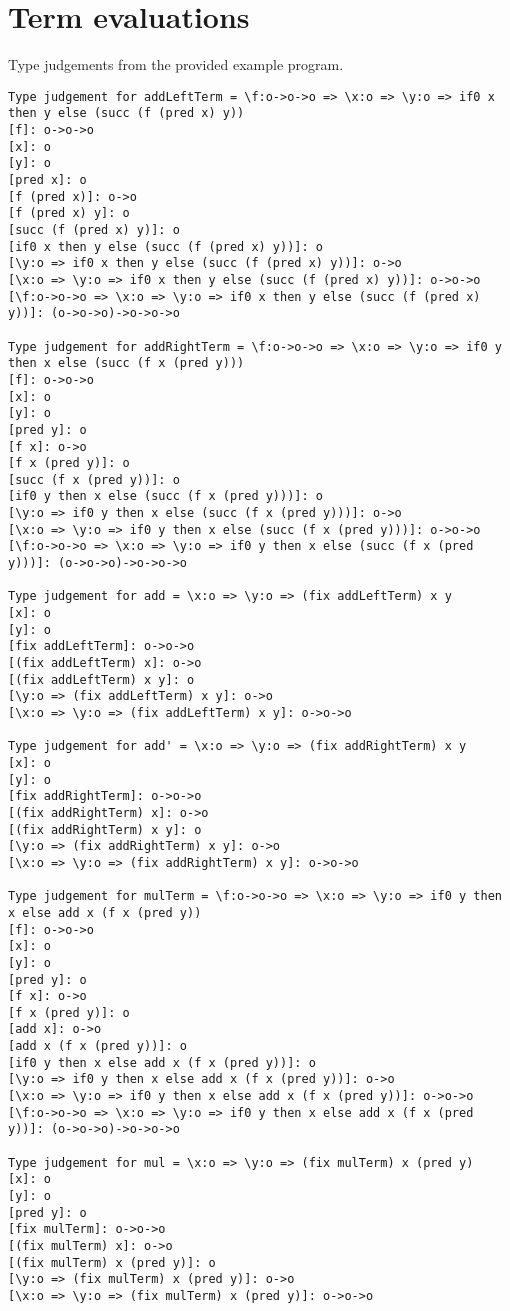 \documentclass[12pt,a4paper]{report}
\theoremstyle{definition}
\theoremstyle{remark}
\begin{document}
\chapter{Term evaluations}\label{appendix: term evaluations}
Type judgements from the provided example program.
\begin{verbatim}
Type judgement for addLeftTerm = \f:o->o->o => \x:o => \y:o => if0 x then y else (succ (f (pred x) y))
[f]: o->o->o
[x]: o
[y]: o
[pred x]: o
[f (pred x)]: o->o
[f (pred x) y]: o
[succ (f (pred x) y)]: o
[if0 x then y else (succ (f (pred x) y))]: o
[\y:o => if0 x then y else (succ (f (pred x) y))]: o->o
[\x:o => \y:o => if0 x then y else (succ (f (pred x) y))]: o->o->o
[\f:o->o->o => \x:o => \y:o => if0 x then y else (succ (f (pred x) y))]: (o->o->o)->o->o->o

Type judgement for addRightTerm = \f:o->o->o => \x:o => \y:o => if0 y then x else (succ (f x (pred y)))
[f]: o->o->o
[x]: o
[y]: o
[pred y]: o
[f x]: o->o
[f x (pred y)]: o
[succ (f x (pred y))]: o
[if0 y then x else (succ (f x (pred y)))]: o
[\y:o => if0 y then x else (succ (f x (pred y)))]: o->o
[\x:o => \y:o => if0 y then x else (succ (f x (pred y)))]: o->o->o
[\f:o->o->o => \x:o => \y:o => if0 y then x else (succ (f x (pred y)))]: (o->o->o)->o->o->o

Type judgement for add = \x:o => \y:o => (fix addLeftTerm) x y
[x]: o
[y]: o
[fix addLeftTerm]: o->o->o
[(fix addLeftTerm) x]: o->o
[(fix addLeftTerm) x y]: o
[\y:o => (fix addLeftTerm) x y]: o->o
[\x:o => \y:o => (fix addLeftTerm) x y]: o->o->o

Type judgement for add' = \x:o => \y:o => (fix addRightTerm) x y
[x]: o
[y]: o
[fix addRightTerm]: o->o->o
[(fix addRightTerm) x]: o->o
[(fix addRightTerm) x y]: o
[\y:o => (fix addRightTerm) x y]: o->o
[\x:o => \y:o => (fix addRightTerm) x y]: o->o->o

Type judgement for mulTerm = \f:o->o->o => \x:o => \y:o => if0 y then x else add x (f x (pred y))
[f]: o->o->o
[x]: o
[y]: o
[pred y]: o
[f x]: o->o
[f x (pred y)]: o
[add x]: o->o
[add x (f x (pred y))]: o
[if0 y then x else add x (f x (pred y))]: o
[\y:o => if0 y then x else add x (f x (pred y))]: o->o
[\x:o => \y:o => if0 y then x else add x (f x (pred y))]: o->o->o
[\f:o->o->o => \x:o => \y:o => if0 y then x else add x (f x (pred y))]: (o->o->o)->o->o->o

Type judgement for mul = \x:o => \y:o => (fix mulTerm) x (pred y)
[x]: o
[y]: o
[pred y]: o
[fix mulTerm]: o->o->o
[(fix mulTerm) x]: o->o
[(fix mulTerm) x (pred y)]: o
[\y:o => (fix mulTerm) x (pred y)]: o->o
[\x:o => \y:o => (fix mulTerm) x (pred y)]: o->o->o


\end{verbatim}
\end{document}
